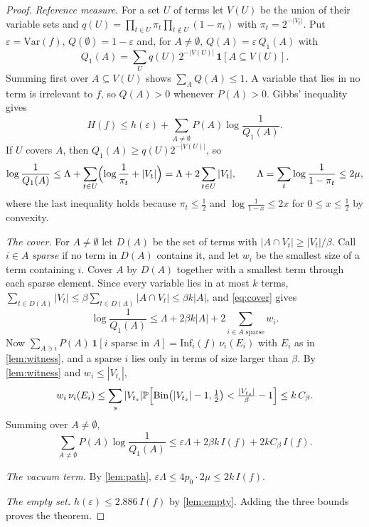 \documentclass[11pt]{amsart}
\theoremstyle{definition}
\theoremstyle{remark}
\renewcommand{\Pr}{\mathbb{P}}
\newcommand{\Inf}{\mathrm{Inf}}
\newcommand{\Var}{\mathrm{Var}}
\newcommand{\Bin}{\mathrm{Bin}}
\begin{document}
\begin{proof}
\emph{Reference measure.} For a set $U$ of terms let $V(U)$ be the union of their variable sets and
$q(U)=\prod_{t\in U}\pi_t\prod_{t\notin U}(1-\pi_t)$ with $\pi_t=2^{-|V_t|}$. Put $\varepsilon=\Var(f)$, $Q(\emptyset)=1-\varepsilon$ and,
for $A\ne\emptyset$, $Q(A)=\varepsilon\,Q_1(A)$ with
\[
Q_1(A)=\sum_Uq(U)\,2^{-|V(U)|}\,\mathbf 1[A\subseteq V(U)].
\]
Summing first over $A\subseteq V(U)$ shows $\sum_AQ(A)\le1$. A variable that lies in no term is irrelevant to $f$,
so $Q(A)>0$ whenever $P(A)>0$. Gibbs' inequality gives
\begin{equation}\label{eq:gibbs}
H(f)\le h(\varepsilon)+\sum_{A\ne\emptyset}P(A)\log\frac1{Q_1(A)}.
\end{equation}
If $U$ covers $A$, then $Q_1(A)\ge q(U)2^{-|V(U)|}$, so
\begin{equation}\label{eq:cover}
\log\frac1{Q_1(A)}\le\Lambda+\sum_{t\in U}\Bigl(\log\frac1{\pi_t}+|V_t|\Bigr)=\Lambda+2\sum_{t\in U}|V_t|,
\qquad \Lambda=\sum_t\log\frac1{1-\pi_t}\le2\mu ,
\end{equation}
where the last inequality holds because $\pi_t\le\frac12$ and $\log\frac1{1-x}\le2x$ for $0\le x\le\frac12$ by
convexity.

\emph{The cover.} For $A\ne\emptyset$ let $D(A)$ be the set of terms with $|A\cap V_t|\ge|V_t|/\beta$. Call $i\in A$
\emph{sparse} if no term in $D(A)$ contains it, and let $w_i$ be the smallest size of a term containing $i$. Cover
$A$ by $D(A)$ together with a smallest term through each sparse element. Since every variable lies in at most $k$
terms, $\sum_{t\in D(A)}|V_t|\le\beta\sum_{t\in D(A)}|A\cap V_t|\le\beta k|A|$, and \eqref{eq:cover} gives
\[
\log\frac1{Q_1(A)}\le\Lambda+2\beta k|A|+2\sum_{i\in A\text{ sparse}}w_i .
\]
Now $\sum_{A\ni i}P(A)\,\mathbf 1[i\text{ sparse in }A]=\Inf_i(f)\,\nu_i(E_i)$ with $E_i$ as in \cref{lem:witness},
and a sparse $i$ lies only in terms of size larger than $\beta$. By \cref{lem:witness} and $w_i\le|V_{t_s}|$,
\[
w_i\,\nu_i(E_i)\le\sum_s|V_{t_s}|\Pr\Bigl[\Bin\bigl(|V_{t_s}|-1,\tfrac12\bigr)<\tfrac{|V_{t_s}|}\beta-1\Bigr]\le k\,C_\beta .
\]
Summing over $A\ne\emptyset$,
\[
\sum_{A\ne\emptyset}P(A)\log\frac1{Q_1(A)}\le\varepsilon\Lambda+2\beta k\,I(f)+2kC_\beta\,I(f).
\]

\emph{The vacuum term.} By \cref{lem:path}, $\varepsilon\Lambda\le4p_0\cdot2\mu\le2k\,I(f)$.

\emph{The empty set.} $h(\varepsilon)\le2.886\,I(f)$ by \cref{lem:empty}. Adding the three bounds proves the theorem.
\end{proof}
\end{document}
